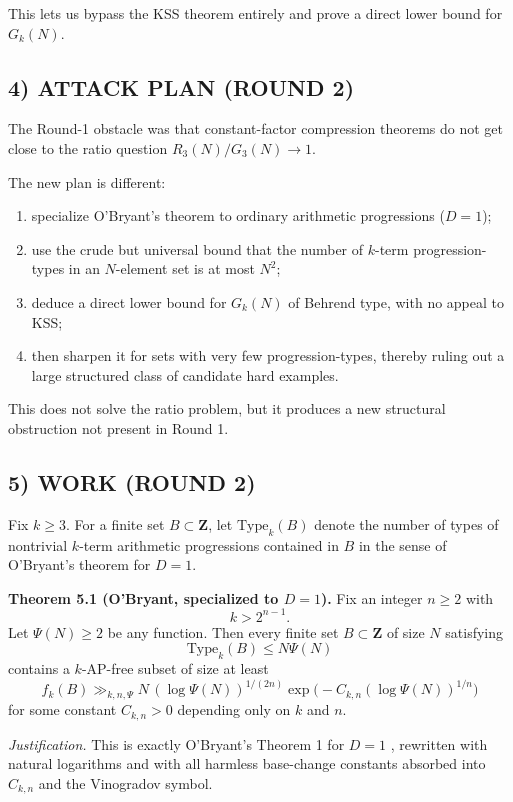 This lets us bypass the KSS theorem entirely and prove a direct lower bound for $G_k(N)$.

\subsection*{4) ATTACK PLAN (ROUND 2)}
The Round-1 obstacle was that constant-factor compression theorems do not get close to the ratio question $R_3(N)/G_3(N)\to 1$.

The new plan is different:
\begin{enumerate}
\item specialize O'Bryant's theorem to ordinary arithmetic progressions ($D=1$);
\item use the crude but universal bound that the number of $k$-term progression-types in an $N$-element set is at most $N^2$;
\item deduce a direct lower bound for $G_k(N)$ of Behrend type, with no appeal to KSS;
\item then sharpen it for sets with very few progression-types, thereby ruling out a large structured class of candidate hard examples.
\end{enumerate}
This does not solve the ratio problem, but it produces a new structural obstruction not present in Round 1.

\subsection*{5) WORK (ROUND 2)}
Fix $k\ge 3$.
For a finite set $B\subset \mathbf Z$, let $\mathrm{Type}_k(B)$ denote the number of types of nontrivial $k$-term arithmetic progressions contained in $B$ in the sense of O'Bryant's theorem for $D=1$.

\medskip
\noindent\textbf{Theorem 5.1 (O'Bryant, specialized to $D=1$).}
Fix an integer $n\ge 2$ with
\[
k>2^{n-1}.
\]
Let $\Psi(N)\ge 2$ be any function.  Then every finite set $B\subset \mathbf Z$ of size $N$ satisfying
\[
\mathrm{Type}_k(B)\le N\Psi(N)
\]
contains a $k$-AP-free subset of size at least
\[
f_k(B)\gg_{k,n,\Psi} N\, (\log \Psi(N))^{1/(2n)}
\exp\!
\bigl(-C_{k,n}(\log \Psi(N))^{1/n}\bigr)
\]
for some constant $C_{k,n}>0$ depending only on $k$ and $n$.

\smallskip
\noindent\emph{Justification.}
This is exactly O'Bryant's Theorem 1 for $D=1$ \cite{OBryant10}, rewritten with natural logarithms and with all harmless base-change constants absorbed into $C_{k,n}$ and the Vinogradov symbol.


